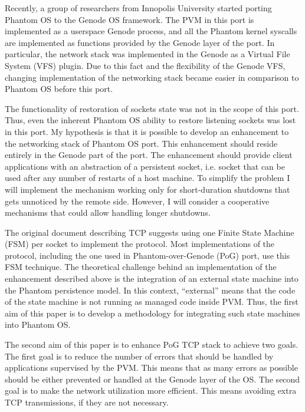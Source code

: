 Recently, a group of researchers from Innopolis University started porting
Phantom OS to the Genode OS framework. The PVM in this port is implemented as a
userspace Genode process, and all the Phantom kernel syscalls are implemented
as functions provided by the Genode layer of the port. In particular, the
network stack was implemented in the Genode as a Virtual File System (VFS)
plugin. Due to this fact and the flexibility of the Genode VFS, changing
implementation of the networking stack became easier in comparison to Phantom
OS before this port. 

The functionality of restoration of sockets state was not in the scope of this
port. Thus, even the inherent Phantom OS ability to restore listening sockets
was lost in this port. My hypothesis is that it is possible to develop an
enhancement to the networking stack of Phantom OS port. This enhancement should
reside entirely in the Genode part of the port. The enhancement should provide
client applications with an abstraction of a persistent socket, i.e. socket
that can be used after any number of restarts of a host machine. To simplify
the problem I will implement the mechanism working only for short-duration
shutdowns that gets unnoticed by the remote side. However, I will consider
a cooperative mechanisms that could allow handling longer shutdowns.

The original document describing TCP \cite{john1981transmission} suggests using
one Finite State Machine (FSM) per socket to implement the protocol. Most
implementations of the protocol, including the one used in Phantom-over-Genode
(PoG) port, use this FSM technique. The theoretical challenge behind an
implementation of the enhancement described above is the integration of an
external state machine into the Phantom persistence model. In this context,
“external” means that the code of the state machine is not running as managed
code inside PVM. Thus, the first aim of this paper is to develop a methodology
for integrating such state machines into Phantom OS. 

The second aim of this paper is to enhance PoG TCP stack to achieve two goals.
The first goal is to reduce the number of errors that should be handled by
applications supervised by the PVM. This means that as many errors as possible
should be either prevented or handled at the Genode layer of the OS. The second
goal is to make the network utilization more efficient. This means avoiding
extra TCP transmissions, if they are not necessary.

